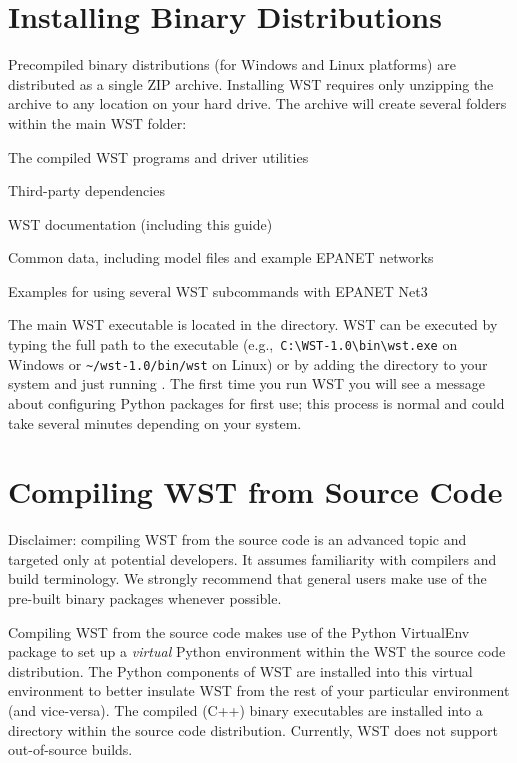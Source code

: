 \section{Installing Binary Distributions}

Precompiled binary distributions (for Windows and Linux platforms) are
distributed as a single ZIP archive. Installing WST requires only
unzipping the archive to any location on your hard drive. The archive
will create several folders within the main WST folder:
\begin{description}[topsep=0pt,parsep=0.5em,itemsep=-0.4em,labelwidth=5em,labelindent=7em,]
\item[bin] The compiled WST programs and driver utilities
\item[dist] Third-party dependencies
\item[doc] WST documentation (including this guide)
\item[etc] Common data, including model files and example EPANET
  networks
\item[examples] Examples for using several WST subcommands with EPANET Net3
\end{description}

The main WST executable is located in the  directory. WST
can be executed by typing the full path to the executable (e.g.,\
\verb~C:\WST-1.0\bin\wst.exe~ on Windows or \verb|~/wst-1.0/bin/wst| on
Linux) or by adding the \code{wst/bin} directory to your system
 and just running . The first time you
run WST you will see a message about configuring Python packages for
first use; this process is normal and could take several minutes
depending on your system.



\section{Compiling WST from Source Code}

Disclaimer: compiling WST from the source code is an advanced topic and targeted
only at potential developers. It assumes familiarity with compilers and
build terminology. We strongly recommend that general users make use of
the pre-built binary packages whenever possible.  

Compiling WST from the source code makes use of the Python VirtualEnv package to
set up a \emph{virtual} Python environment within the WST the source code
distribution. The Python components of WST are installed into this
virtual environment to better insulate WST from the rest of your
particular environment (and vice-versa). The compiled (C++) binary
executables are installed into a \code{bin} directory within the
source code distribution. Currently, WST does not support out-of-source builds.

